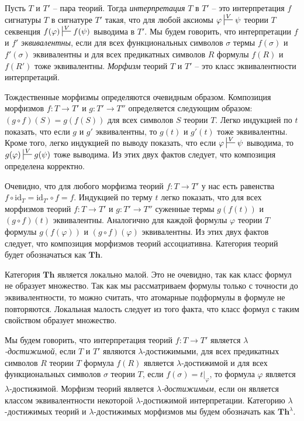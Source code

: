 \documentclass[reqno]{amsart}
\theoremstyle{definition}
\theoremstyle{remark}
\newcommand{\bcat}[1]{\mathbf{#1}}
\newcommand{\fs}[1]{\mathrm{#1}}
\newcommand{\Th}{\bcat{Th}}
\begin{document}
Пусть $T$ и $T'$ -- пара теорий.
Тогда \emph{интерпретация} $T$ в $T'$ -- это интерпретация $f$ сигнатуры $T$ в сигнатуре $T'$ такая,
что для любой аксиомы $\varphi \sststile{}{V} \psi$ теории $T$ секвенция $f(\varphi) \sststile{}{V} f(\psi)$ выводима в $T'$.
Мы будем говорить, что интерпретации $f$ и $f'$ \emph{эквивалентны}, если для всех функциональных символов $\sigma$ термы $f(\sigma)$ и $f'(\sigma)$ эквивалентны и для всех предикатных символов $R$ формулы $f(R)$ и $f(R')$ тоже эквивалентны.
\emph{Морфизм} теорий $T$ и $T'$ -- это класс эквивалентности интерпретаций.

Тождественные морфизмы определяются очевидным образом.
Композиция морфизмов $f : T \to T'$ и $g : T' \to T''$ определяется следующим образом: $(g \circ f)(S) = g(f(S))$ для всех символов $S$ теории $T$.
Легко индукцией по $t$ показать, что если $g$ и $g'$ эквивалентны, то $g(t)$ и $g'(t)$ тоже эквивалентны.
Кроме того, легко индукцией по выводу показать, что если $\varphi \sststile{}{V} \psi$ выводима, то $g(\varphi) \sststile{}{V} g(\psi)$ тоже выводима.
Из этих двух фактов следует, что композиция определена корректно.

Очевидно, что для любого морфизма теорий $f : T \to T'$ у нас есть равенства $f \circ \fs{id}_T = \fs{id}_{T'} \circ f = f$.
Индукцией по терму $t$ легко показать, что для всех морфизмов теорий $f : T \to T'$ и $g : T' \to T''$ суженные термы $g(f(t))$ и $(g \circ f)(t)$ эквивалентны.
Аналогично для каждой формулы $\varphi$ теории $T$ формулы $g(f(\varphi))$ и $(g \circ f)(\varphi)$ эквивалентны.
Из этих двух фактов следует, что композиция морфизмов теорий ассоциативна.
Категория теорий будет обозначаться как $\Th$.

\begin{remark}
Категория $\Th$ является локально малой.
Это не очевидно, так как класс формул не образует множество.
Так как мы рассматриваем формулы только с точности до эквивалентности, то можно считать, что атомарные подформулы в формуле не повторяются.
Локальная малость следует из того факта, что класс формул с таким свойством образует множество.
\end{remark}

Мы будем говорить, что интерпретация теорий $f : T \to T'$ является \emph{$\lambda$-достижимой}, если $T$ и $T'$ являются $\lambda$-достижимыми, для всех предикатных символов $R$ теории $T$ формула $f(R)$ является $\lambda$-достижимой
и для всех функциональных символов $\sigma$ теории $T$, если $f(\sigma) = t|_\varphi$, то формула $\varphi$ является $\lambda$-достижимой.
Морфизм теорий является \emph{$\lambda$-достижимым}, если он является классом эквивалентности некоторой $\lambda$-достижимой интерпретации.
Категорию $\lambda$-достижимых теорий и $\lambda$-достижимых морфизмов мы будем обозначать как $\Th^\lambda$.
\end{document}

